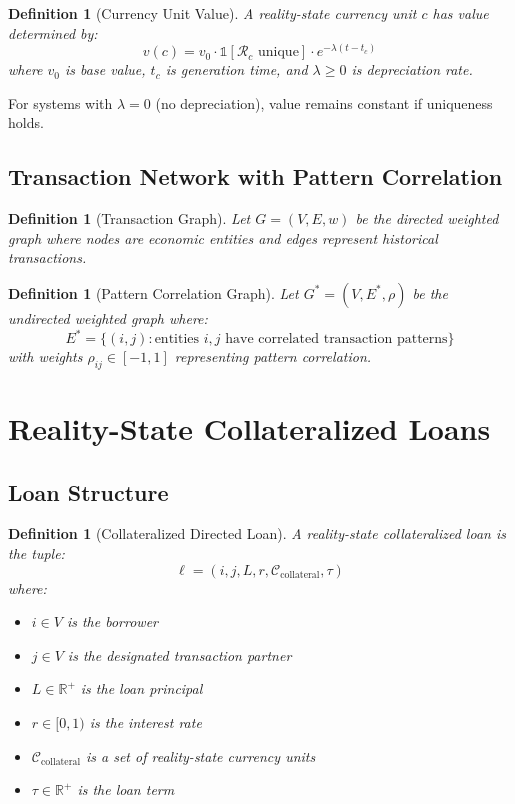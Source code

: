 \documentclass[12pt]{article}
\newtheorem{definition}[theorem]{Definition}
\begin{document}
\begin{definition}[Currency Unit Value]
A reality-state currency unit $c$ has value determined by:
$$
v(c) = v_0 \cdot \mathbb{1}[\mathcal{R}_c \text{ unique}] \cdot e^{-\lambda(t - t_c)}
$$
where $v_0$ is base value, $t_c$ is generation time, and $\lambda \geq 0$ is depreciation rate.
\end{definition}

For systems with $\lambda = 0$ (no depreciation), value remains constant if uniqueness holds.

\subsection{Transaction Network with Pattern Correlation}

\begin{definition}[Transaction Graph]
Let $G = (V,E,w)$ be the directed weighted graph where nodes are economic entities and edges represent historical transactions.
\end{definition}

\begin{definition}[Pattern Correlation Graph]
Let $G^* = (V, E^*, \rho)$ be the undirected weighted graph where:
$$
E^* = \{(i,j): \text{entities } i,j \text{ have correlated transaction patterns}\}
$$
with weights $\rho_{ij} \in [-1,1]$ representing pattern correlation.
\end{definition}

\section{Reality-State Collateralized Loans}

\subsection{Loan Structure}

\begin{definition}[Collateralized Directed Loan]
A reality-state collateralized loan is the tuple:
$$
\ell = (i, j, L, r, \mathcal{C}_{\text{collateral}}, \tau)
$$
where:
\begin{itemize}
    \item $i \in V$ is the borrower
    \item $j \in V$ is the designated transaction partner
    \item $L \in \mathbb{R}^+$ is the loan principal
    \item $r \in [0,1)$ is the interest rate
    \item $\mathcal{C}_{\text{collateral}}$ is a set of reality-state currency units
    \item $\tau \in \mathbb{R}^+$ is the loan term
\end{itemize}
\end{definition}
\end{document}
